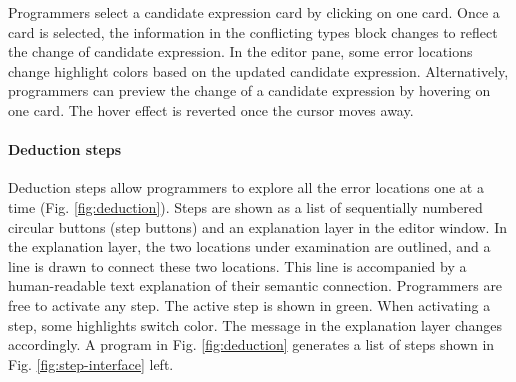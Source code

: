 

Programmers select a candidate expression card by clicking on one card. Once a card is selected, the information in the conflicting types block changes to reflect the change of candidate expression. In the editor pane, some error locations change highlight colors based on the updated candidate expression. Alternatively, programmers can preview the change of a candidate expression by hovering on one card. The hover effect is reverted once the cursor moves away. 


\paragraph{Deduction steps}  \label{sub:deduction-steps}



Deduction steps allow programmers to explore all the error locations one at a time (Fig. \ref{fig:deduction}). Steps are shown as a list of sequentially  numbered circular buttons (step buttons) and an explanation layer in the editor window. In the explanation layer, the two locations under examination are outlined, and a line is drawn to connect these two locations. This line is accompanied by a human-readable text explanation of their semantic connection. Programmers are free to activate any step. The active step is shown in green. When activating a step, some highlights switch color. The message in the explanation layer changes accordingly. A program in Fig. \ref{fig:deduction} generates a list of steps shown in Fig. \ref{fig:step-interface} left.


